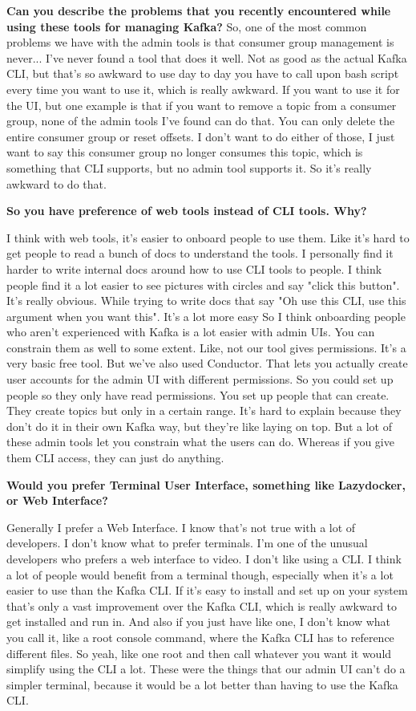 \textbf{Can you describe the problems that you recently encountered while using these tools for managing Kafka?
}
So, one of the most common problems we have with the admin tools is that consumer group management is never... I've never found a tool that does it well. Not as good as the actual Kafka CLI, but that's so awkward to use day to day you have to call upon bash script every time you want to use it, which is really awkward. If you want to use it for the UI, but one example is that if you want to remove a topic from a consumer group, none of the admin tools I've found can do that. You can only delete the entire consumer group or reset offsets. I don't want to do either of those, I just want to say this consumer group no longer consumes this topic, which is something that CLI supports, but no admin tool supports it. So it's really awkward to do that. 

\textbf{So you have preference of web tools instead of CLI tools. Why?}

I think with web tools, it's easier to onboard people to use them. Like it's hard to get people to read a bunch of docs to understand the tools. I personally find it harder to write internal docs around how to use CLI tools to people. I think people find it a lot easier to see pictures with circles and say "click this button". It's really obvious. While trying to write docs that say "Oh use this CLI, use this argument when you want this". It's a lot more easy So I think onboarding people who aren't experienced with Kafka is a lot easier with admin UIs. You can constrain them as well to some extent. Like, not our tool gives permissions. It's a very basic free tool. But we've also used Conductor. That lets you actually create user accounts for the admin UI with different permissions. So you could set up people so they only have read permissions. You set up people that can create. They create topics but only in a certain range. It's hard to explain because they don't do it in their own Kafka way, but they're like laying on top. But a lot of these admin tools let you constrain what the users can do. Whereas if you give them CLI access, they can just do anything. 

\textbf{Would you prefer Terminal User Interface, something like Lazydocker, or Web Interface?}

Generally I prefer a Web Interface. I know that's not true with a lot of developers. I don't know what to prefer terminals. I'm one of the unusual developers who prefers a web interface to video. I don't like using a CLI. I think a lot of people would benefit from a terminal though, especially when it's a lot easier to use than the Kafka CLI. If it's easy to install and set up on your system that's only a vast improvement over the Kafka CLI, which is really awkward to get installed and run in. And also if you just have like one, I don't know what you call it, like a root console command, where the Kafka CLI has to reference different files. So yeah, like one root and then call whatever you want it would simplify using the CLI a lot. These were the things that our admin UI can't do a simpler terminal, because it would be a lot better than having to use the Kafka CLI. 

